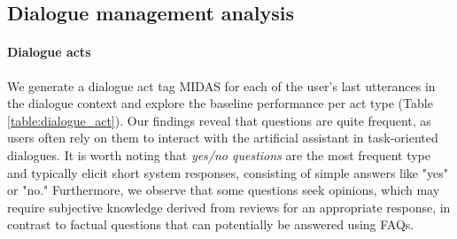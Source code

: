 \documentclass[11pt]{article}
\begin{document}
\begin{table}[!ht]
    \centering
    \caption{Data statistics (frequency and average system response length) and baseline performance per dialogue act.}
    \label{table:dialogue_act}
\end{table}

\subsection{Dialogue management analysis}
\paragraph{Dialogue acts} We generate a dialogue act tag MIDAS \cite{midas-2019} for each of the user's last utterances in the dialogue context and explore the baseline performance per act type (Table \ref{table:dialogue_act}). Our findings reveal that questions are quite frequent, as users often rely on them to interact with the artificial assistant in task-oriented dialogues.  It is worth noting that \textit{yes/no questions} are the most frequent type and typically elicit short system responses, consisting of simple answers like "yes" or "no." Furthermore, we observe that some questions seek opinions, which may require subjective knowledge derived from reviews for an appropriate response, in contrast to factual questions that can potentially be answered using FAQs.
\end{document}
